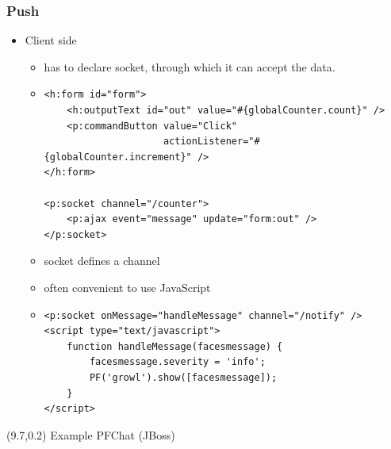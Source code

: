 \documentclass[10pt,xcolor=pdflatex]{beamer}
\begin{document}
\begin{frame}[containsverbatim]\frametitle{Push}
  \begin{itemize}
    \item Client side
	  \begin{itemize}
		\item has to declare socket, through which it can accept the data.
        \item[] \begin{footnotesize} \begin{verbatim}
<h:form id="form">
    <h:outputText id="out" value="#{globalCounter.count}" />
    <p:commandButton value="Click" 
                     actionListener="#{globalCounter.increment}" />
</h:form>
 
<p:socket channel="/counter">
    <p:ajax event="message" update="form:out" />
</p:socket> 

\end{verbatim} \end{footnotesize}
        \item socket defines a channel
    	\item often convenient to use JavaScript
        \vspace{0.1cm}
        \item[] \begin{footnotesize} \begin{verbatim}
<p:socket onMessage="handleMessage" channel="/notify" />
<script type="text/javascript">
    function handleMessage(facesmessage) {
        facesmessage.severity = 'info';
        PF('growl').show([facesmessage]);
    }
</script>
\end{verbatim} \end{footnotesize}
      \end{itemize}
  \end{itemize}
\begin{textblock}{10}(9.7,0.2)
    {\footnotesize Example PFChat (JBoss)}
\end{textblock}
\end{frame}
\end{document}
